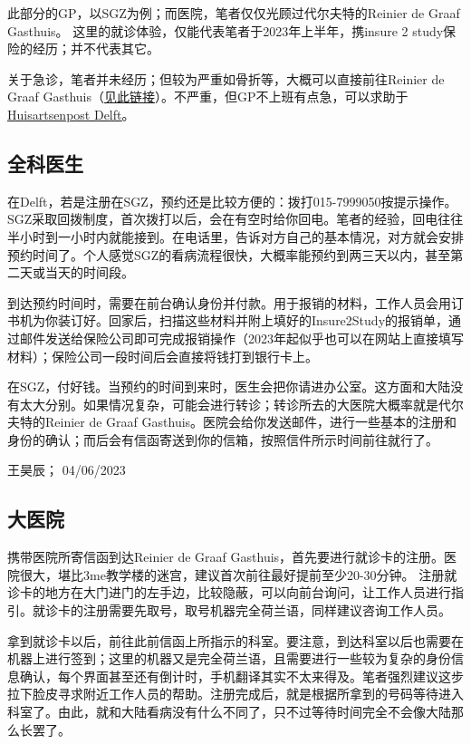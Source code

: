 此部分的GP，以SGZ为例；而医院，笔者仅仅光顾过代尔夫特的Reinier de Graaf Gasthuis。 这里的就诊体验，仅能代表笔者于2023年上半年，携insure 2 study保险的经历；并不代表其它。

关于急诊，笔者并未经历；但较为严重如骨折等，大概可以直接前往Reinier de Graaf Gasthuis（\href{https://reinierdegraaf.nl/specialisme/spoedeisende-hulp}{\uline{见此链接}}）。不严重，但GP不上班有点急，可以求助于\href{https://hapschievliet.nl/language/english/}{\uline{Huisartsenpost Delft}}。


\subsection{全科医生}
在Delft，若是注册在SGZ，预约还是比较方便的：拨打015-7999050按提示操作。SGZ采取回拨制度，首次拨打以后，会在有空时给你回电。笔者的经验，回电往往半小时到一小时内就能接到。在电话里，告诉对方自己的基本情况，对方就会安排预约时间了。个人感觉SGZ的看病流程很快，大概率能预约到两三天以内，甚至第二天或当天的时间段。

到达预约时间时，需要在前台确认身份并付款。用于报销的材料，工作人员会用订书机为你装订好。回家后，扫描这些材料并附上填好的Insure2Study的报销单，通过邮件发送给保险公司即可完成报销操作（2023年起似乎也可以在网站上直接填写材料）；保险公司一段时间后会直接将钱打到银行卡上。

在SGZ，付好钱。当预约的时间到来时，医生会把你请进办公室。这方面和大陆没有太大分别。如果情况复杂，可能会进行转诊；转诊所去的大医院大概率就是代尔夫特的Reinier de Graaf Gasthuis。医院会给你发送邮件，进行一些基本的注册和身份的确认；而后会有信函寄送到你的信箱，按照信件所示时间前往就行了。
\begin{flushright}
王昊辰； 04/06/2023
\end{flushright}

\subsection{大医院}
携带医院所寄信函到达Reinier de Graaf Gasthuis，首先要进行就诊卡的注册。医院很大，堪比3me教学楼的迷宫，建议首次前往最好提前至少20-30分钟。 注册就诊卡的地方在大门进门的左手边，比较隐蔽，可以向前台询问，让工作人员进行指引。就诊卡的注册需要先取号，取号机器完全荷兰语，同样建议咨询工作人员。

拿到就诊卡以后，前往此前信函上所指示的科室。要注意，到达科室以后也需要在机器上进行签到；这里的机器又是完全荷兰语，且需要进行一些较为复杂的身份信息确认，每个界面甚至还有倒计时，手机翻译其实不太来得及。笔者强烈建议这步拉下脸皮寻求附近工作人员的帮助。注册完成后，就是根据所拿到的号码等待进入科室了。由此，就和大陆看病没有什么不同了，只不过等待时间完全不会像大陆那么长罢了。

